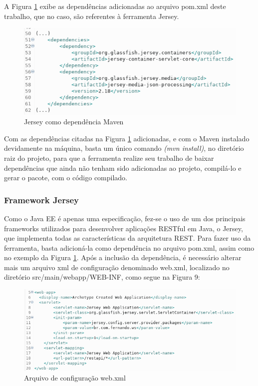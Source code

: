 \documentclass[12pt]{article}
\begin{document}
A Figura \ref{fig:Figura5} exibe as dependências adicionadas ao arquivo pom.xml deste trabalho, que no caso, são referentes à ferramenta Jersey.
\begin{figure}[ht]
	\centering
	\includegraphics[width=.9\textwidth]{jersey-pom.png}
	\caption{Jersey como dependência Maven}
	\label{fig:Figura5}
\end{figure}


Com as dependências citadas na Figura \ref{fig:Figura5} adicionadas, e com o Maven instalado devidamente na máquina, basta um único comando \textit{(mvn install)}, no diretório raiz do projeto, para que a ferramenta realize seu trabalho de baixar dependências que ainda não tenham sido adicionadas ao projeto, compilá-lo e gerar o pacote, com o código compilado.

\subsubsection{Framework Jersey}

Como o Java EE é apenas uma especificação, fez-se o uso de um dos principais frameworks utilizados para desenvolver aplicações RESTful em Java, o Jersey, que implementa todas as características da arquitetura REST. Para fazer uso da ferramenta, basta adicioná-la como dependência no arquivo pom.xml, assim como no exemplo da Figura \ref{fig:Figura5}. Após a inclusão da dependência, é necessário alterar mais um arquivo xml de configuração denominado web.xml, localizado no diretório src/main/webapp/WEB-INF, como segue na Figura 9:

\begin{figure}[ht]
	\centering
	\includegraphics[width=.9\textwidth]{web-xml.png}
	\caption{Arquivo de configuração web.xml}
	\label{fig:Figura9}
\end{figure}
\end{document}
